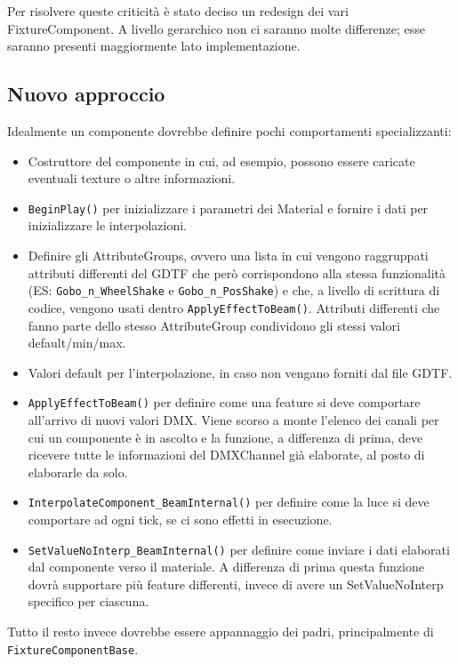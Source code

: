 \documentclass[main.tex]{subfiles}
\begin{document}
Per risolvere queste criticità è stato deciso un redesign dei vari FixtureComponent. A livello gerarchico non ci saranno molte differenze; esse saranno presenti maggiormente lato implementazione.

\subsection{Nuovo approccio}\label{subsec:3_idea}
Idealmente un componente dovrebbe definire pochi comportamenti specializzanti:
\begin{itemize}
    \item Costruttore del componente in cui, ad esempio, possono essere caricate eventuali texture o altre informazioni.
    \item \lstinline{BeginPlay()} per inizializzare i parametri dei Material e fornire i dati per inizializzare le interpolazioni.
    \item Definire gli AttributeGroups, ovvero una lista in cui vengono raggruppati attributi differenti del GDTF che però corrispondono alla stessa funzionalità (ES: \lstinline{Gobo_n_WheelShake} e \lstinline{Gobo_n_PosShake}) e che, a livello di scrittura di codice, vengono usati  dentro \lstinline{ApplyEffectToBeam()}. Attributi differenti che fanno parte dello stesso AttributeGroup condividono gli stessi valori default/min/max.
    \item Valori default per l'interpolazione, in caso non vengano forniti dal file GDTF.
    \item \lstinline{ApplyEffectToBeam()} per definire come una feature si deve comportare all'arrivo di nuovi valori DMX. Viene scorso a monte l'elenco dei canali per cui un componente è in ascolto e la funzione, a differenza di prima, deve ricevere tutte le informazioni del DMXChannel già elaborate, al posto di elaborarle da solo. 
    \item \lstinline{InterpolateComponent_BeamInternal()} per definire come la luce si deve comportare ad ogni tick, se ci sono effetti in esecuzione.
    \item \lstinline{SetValueNoInterp_BeamInternal()} per definire come inviare i dati elaborati dal componente verso il materiale. A differenza di prima questa funzione dovrà supportare più feature differenti, invece di avere un SetValueNoInterp specifico per ciascuna.
\end{itemize}

Tutto il resto invece dovrebbe essere appannaggio  dei padri, principalmente di \lstinline{FixtureComponentBase}. \newline
\end{document}
